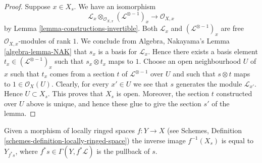 \begin{proof}
Suppose $x \in X_s$.
We have an isomorphism
$$
\mathcal{L}_x \otimes_{\mathcal{O}_{X, x}} (\mathcal{L}^{\otimes -1})_x
\longrightarrow
\mathcal{O}_{X, x}
$$
by Lemma \ref{lemma-constructions-invertible}.
Both $\mathcal{L}_x$ and $(\mathcal{L}^{\otimes -1})_x$
are free $\mathcal{O}_{X, x}$-modules of rank $1$. We conclude
from Algebra, Nakayama's Lemma \ref{algebra-lemma-NAK} that
$s_x$ is a basis for $\mathcal{L}_x$. Hence there exists
a basis element $t_x \in (\mathcal{L}^{\otimes -1})_x$
such that $s_x \otimes t_x$ maps to $1$.
Choose an open neighbourhood $U$ of
$x$ such that $t_x$ comes from a section $t$
of $\mathcal{L}^{\otimes -1}$ over $U$ and such that
$s \otimes t$ maps to $1 \in \mathcal{O}_X(U)$.
Clearly, for every $x' \in U$ we see that $s$ generates
the module $\mathcal{L}_{x'}$. Hence $U \subset X_s$.
This proves that $X_s$ is open. Moreover, the section
$t$ constructed over $U$ above is unique, and hence
these glue to give the section $s'$ of the lemma.
\end{proof}

\begin{remark}
\label{remark-pullback-s-open}
Given a morphism of locally ringed spaces $f : Y \to X$
(see Schemes, Definition \ref{schemes-definition-locally-ringed-space})
the inverse image $f^{-1}(X_s)$ is equal to $Y_{f^*s}$, where
$f^*s \in \Gamma(Y, f^*\mathcal{L})$ is the pullback of $s$.
\end{remark}



